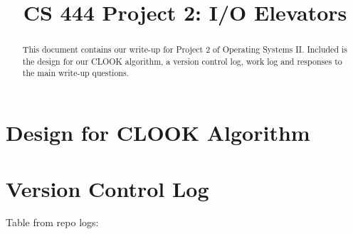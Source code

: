 \documentclass[10pt,letterpaper,draftclsnofoot,onecolumn]{IEEEtran}
\begin{document}

\begin{titlepage}
\title{CS 444 Project 2: I/O Elevators}
\author
{
}
    \maketitle
    \vspace{2cm}
    \begin{abstract}
        \noindent This document contains our write-up for Project 2 of Operating Systems II. Included is the design for our CLOOK algorithm, a version control log, work log and responses to the main write-up questions. 
    \end{abstract}

\end{titlepage}

\section{Design for CLOOK Algorithm}

\section{Version Control Log}
\noindent Table from repo logs:
\end{document}
